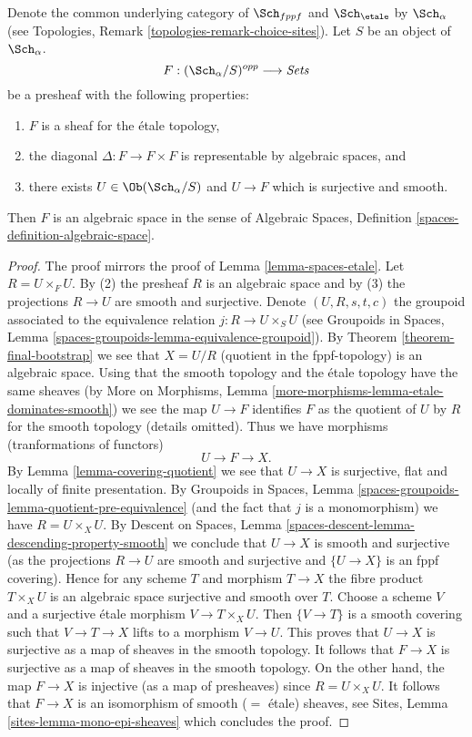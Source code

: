 \begin{lemma}
\label{lemma-spaces-etale-smooth-cover}
Denote the common underlying category of $\Sch_{fppf}$
and $\Sch_\etale$ by $\Sch_\alpha$ (see
Topologies, Remark \ref{topologies-remark-choice-sites}). Let $S$ be an object
of $\Sch_\alpha$. 
$$
F : (\Sch_\alpha/S)^{opp} \longrightarrow \textit{Sets}
$$
be a presheaf with the following properties:
\begin{enumerate}
\item $F$ is a sheaf for the \'etale topology,
\item the diagonal $\Delta : F \to F \times F$ is representable
by algebraic spaces, and
\item there exists $U \in \Ob(\Sch_\alpha/S)$
and $U \to F$ which is surjective and smooth.
\end{enumerate}
Then $F$ is an algebraic space in the sense of
Algebraic Spaces, Definition \ref{spaces-definition-algebraic-space}.
\end{lemma}

\begin{proof}
The proof mirrors the proof of Lemma \ref{lemma-spaces-etale}. Let
$R = U \times_F U$. By (2) the presheaf $R$ is an algebraic space and by (3)
the projections $R \to U$ are smooth and surjective. Denote $(U, R, s, t, c)$
the groupoid associated to the equivalence relation $j : R \to U \times_S U$
(see Groupoids in Spaces, Lemma
\ref{spaces-groupoids-lemma-equivalence-groupoid}).
By Theorem \ref{theorem-final-bootstrap} we see that $X = U/R$ (quotient
in the fppf-topology) is an algebraic space. Using that the smooth
topology and the \'etale topology have the same sheaves (by
More on Morphisms, Lemma \ref{more-morphisms-lemma-etale-dominates-smooth})
we see the map $U \to F$ identifies $F$ as the quotient of
$U$ by $R$ for the smooth topology (details omitted).
Thus we have morphisms (tranformations of functors)
$$
U \to F \to X.
$$
By Lemma \ref{lemma-covering-quotient} we see that $U \to X$ is
surjective, flat and locally of finite presentation. By
Groupoids in Spaces, Lemma
\ref{spaces-groupoids-lemma-quotient-pre-equivalence}
(and the fact that $j$ is a monomorphism) we have $R = U \times_X U$. By
Descent on Spaces, Lemma \ref{spaces-descent-lemma-descending-property-smooth}
we conclude that $U \to X$ is smooth and surjective (as the projections
$R \to U$ are smooth and surjective and $\{U \to X\}$ is an fppf
covering). Hence for any scheme $T$ and morphism $T \to X$ the fibre product
$T \times_X U$ is an algebraic space surjective and smooth over $T$.
Choose a scheme $V$ and a surjective \'etale morphism $V \to T \times_X U$.
Then $\{V \to T\}$ is a smooth covering such that $V \to T \to X$
lifts to a morphism $V \to U$. This proves that
$U \to X$ is surjective as a map of sheaves in the smooth topology.
It follows that $F \to X$ is surjective as a map of sheaves in the smooth
topology. On the other hand, the map $F \to X$ is injective (as a map
of presheaves) since $R = U \times_X U$.
It follows that $F \to X$ is an isomorphism of smooth ($=$ \'etale)
sheaves, see Sites, Lemma \ref{sites-lemma-mono-epi-sheaves}
which concludes the proof.
\end{proof}













